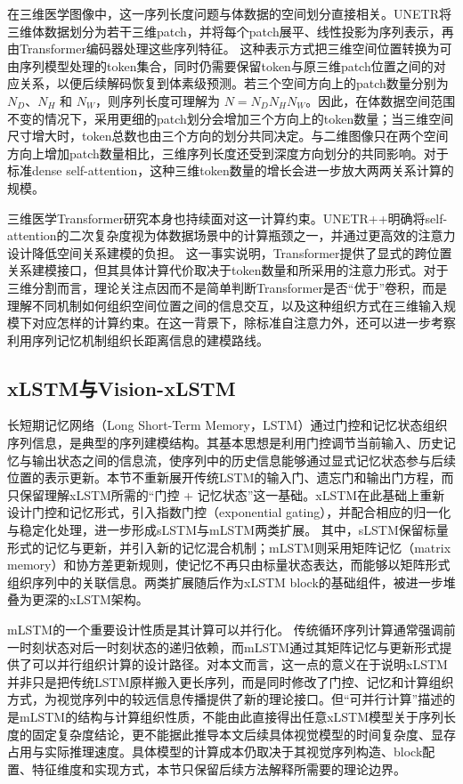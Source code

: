 在三维医学图像中，这一序列长度问题与体数据的空间划分直接相关。UNETR将三维体数据划分为若干三维patch，并将每个patch展平、线性投影为序列表示，再由Transformer编码器处理这些序列特征。\cite{hatamizadeh2022unetr} 这种表示方式把三维空间位置转换为可由序列模型处理的token集合，同时仍需要保留token与原三维patch位置之间的对应关系，以便后续解码恢复到体素级预测。若三个空间方向上的patch数量分别为 \(N_D\)、\(N_H\) 和 \(N_W\)，则序列长度可理解为 \(N=N_DN_HN_W\)。因此，在体数据空间范围不变的情况下，采用更细的patch划分会增加三个方向上的token数量；当三维空间尺寸增大时，token总数也由三个方向的划分共同决定。与二维图像只在两个空间方向上增加patch数量相比，三维序列长度还受到深度方向划分的共同影响。对于标准dense self-attention，这种三维token数量的增长会进一步放大两两关系计算的规模。

三维医学Transformer研究本身也持续面对这一计算约束。UNETR++明确将self-attention的二次复杂度视为体数据场景中的计算瓶颈之一，并通过更高效的注意力设计降低空间关系建模的负担。\cite{shaker2024unetrpp} 这一事实说明，Transformer提供了显式的跨位置关系建模接口，但其具体计算代价取决于token数量和所采用的注意力形式。对于三维分割而言，理论关注点因而不是简单判断Transformer是否“优于”卷积，而是理解不同机制如何组织空间位置之间的信息交互，以及这种组织方式在三维输入规模下对应怎样的计算约束。在这一背景下，除标准自注意力外，还可以进一步考察利用序列记忆机制组织长距离信息的建模路线。

\subsection{xLSTM与Vision-xLSTM}

长短期记忆网络（Long Short-Term Memory，LSTM）通过门控和记忆状态组织序列信息，是典型的序列建模结构。其基本思想是利用门控调节当前输入、历史记忆与输出状态之间的信息流，使序列中的历史信息能够通过显式记忆状态参与后续位置的表示更新。本节不重新展开传统LSTM的输入门、遗忘门和输出门方程，而只保留理解xLSTM所需的“门控 + 记忆状态”这一基础。xLSTM在此基础上重新设计门控和记忆形式，引入指数门控（exponential gating），并配合相应的归一化与稳定化处理，进一步形成sLSTM与mLSTM两类扩展。\cite{beck2024xlstm} 其中，sLSTM保留标量形式的记忆与更新，并引入新的记忆混合机制；mLSTM则采用矩阵记忆（matrix memory）和协方差更新规则，使记忆不再只由标量状态表达，而能够以矩阵形式组织序列中的关联信息。两类扩展随后作为xLSTM block的基础组件，被进一步堆叠为更深的xLSTM架构。

mLSTM的一个重要设计性质是其计算可以并行化。\cite{beck2024xlstm} 传统循环序列计算通常强调前一时刻状态对后一时刻状态的递归依赖，而mLSTM通过其矩阵记忆与更新形式提供了可以并行组织计算的设计路径。对本文而言，这一点的意义在于说明xLSTM并非只是把传统LSTM原样搬入更长序列，而是同时修改了门控、记忆和计算组织方式，为视觉序列中的较远信息传播提供了新的理论接口。但“可并行计算”描述的是mLSTM的结构与计算组织性质，不能由此直接得出任意xLSTM模型关于序列长度的固定复杂度结论，更不能据此推导本文后续具体视觉模型的时间复杂度、显存占用与实际推理速度。具体模型的计算成本仍取决于其视觉序列构造、block配置、特征维度和实现方式，本节只保留后续方法解释所需要的理论边界。

